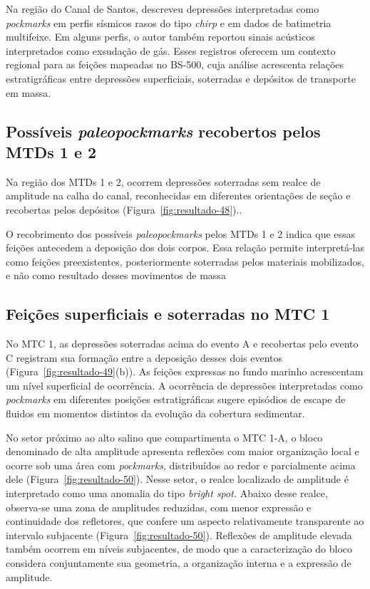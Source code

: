 Na região do Canal de Santos,  descreveu depressões interpretadas como \textit{pockmarks} em perfis sísmicos rasos do tipo \textit{chirp} e em dados de batimetria multifeixe. Em alguns perfis, o autor também reportou sinais acústicos interpretados como exsudação de gás. Esses registros oferecem um contexto regional para as feições mapeadas no BS-500, cuja análise acrescenta relações estratigráficas entre depressões superficiais, soterradas e depósitos de transporte em massa.

\subsection{Possíveis \textit{paleopockmarks} recobertos pelos MTDs 1 e 2}\label{sec:6-4-1}

Na região dos MTDs 1 e 2, ocorrem depressões soterradas sem realce de amplitude na calha do canal, reconhecidas em diferentes orientações de seção e recobertas pelos depósitos (Figura~\ref{fig:resultado-48})..

O recobrimento dos possíveis \textit{paleopockmarks} pelos MTDs 1 e 2 indica que essas feições antecedem a deposição dos dois corpos. Essa relação permite interpretá-las como feições preexistentes, posteriormente soterradas pelos materiais mobilizados, e não como resultado desses movimentos de massa

\subsection{Feições superficiais e soterradas no MTC 1}\label{sec:6-4-2}

No MTC 1, as depressões soterradas acima do evento A e recobertas pelo evento C registram sua formação entre a deposição desses dois eventos (Figura~\ref{fig:resultado-49}(b)). As feições expressas no fundo marinho acrescentam um nível superficial de ocorrência. A ocorrência de depressões interpretadas como \textit{pockmarks} em diferentes posições estratigráficas sugere episódios de escape de fluidos em momentos distintos da evolução da cobertura sedimentar.

No setor próximo ao alto salino que compartimenta o MTC 1-A, o bloco denominado de alta amplitude apresenta reflexões com maior organização local e ocorre sob uma área com \textit{pockmarks}, distribuídos ao redor e parcialmente acima dele (Figura~\ref{fig:resultado-50}). Nesse setor, o realce localizado de amplitude é interpretado como uma anomalia do tipo \textit{bright spot. }Abaixo desse realce, observa-se uma zona de amplitudes reduzidas, com menor expressão e continuidade dos refletores, que confere um aspecto relativamente transparente ao intervalo subjacente (Figura~\ref{fig:resultado-50}). Reflexões de amplitude elevada também ocorrem em níveis subjacentes, de modo que a caracterização do bloco considera conjuntamente sua geometria, a organização interna e a expressão de amplitude.

